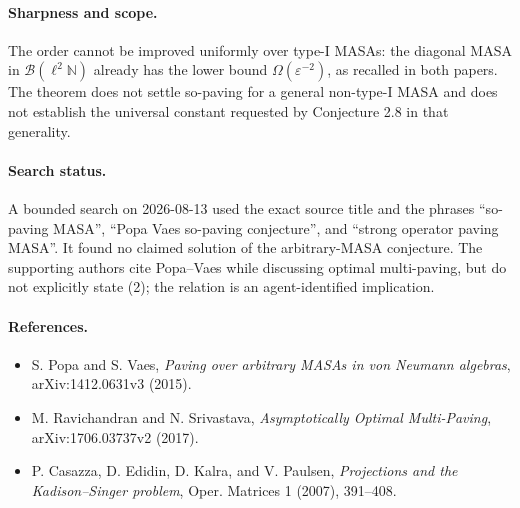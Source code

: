 \documentclass[11pt]{article}
\newcommand{\cB}{\mathcal B}
\begin{document}
\paragraph{Sharpness and scope.}
The order cannot be improved uniformly over type-I MASAs: the diagonal MASA
in $\cB(\ell^2\mathbb N)$ already has the lower bound
$\Omega(\varepsilon^{-2})$, as recalled in both papers.  The theorem does not
settle so-paving for a general non-type-I MASA and does not establish the
universal constant requested by Conjecture 2.8 in that generality.

\paragraph{Search status.}
A bounded search on 2026-08-13 used the exact source title and the phrases
``so-paving MASA'', ``Popa Vaes so-paving conjecture'', and ``strong operator
paving MASA''.  It found no claimed solution of the arbitrary-MASA conjecture.
The supporting authors cite Popa--Vaes while discussing optimal multi-paving,
but do not explicitly state (2); the relation is an agent-identified
implication.

\paragraph{References.}
\begin{itemize}
\item S. Popa and S. Vaes, \emph{Paving over arbitrary MASAs in von Neumann
algebras}, arXiv:1412.0631v3 (2015).
\item M. Ravichandran and N. Srivastava, \emph{Asymptotically Optimal
Multi-Paving}, arXiv:1706.03737v2 (2017).
\item P. Casazza, D. Edidin, D. Kalra, and V. Paulsen,
\emph{Projections and the Kadison--Singer problem}, Oper. Matrices 1 (2007),
391--408.
\end{itemize}
\end{document}
